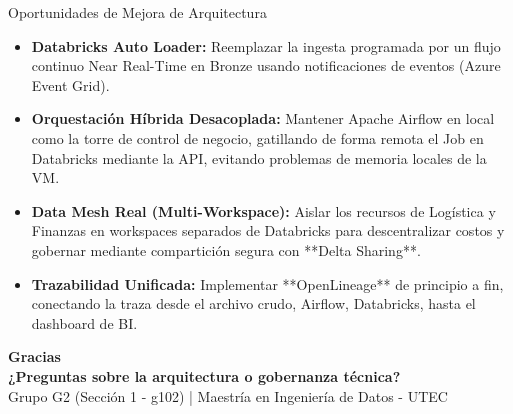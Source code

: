 \documentclass[aspectratio=169,10pt]{beamer}
\begin{document}
\begin{frame}{Oportunidades de Mejora de Arquitectura}
    \begin{itemize}
        \setlength{\itemsep}{0.6em}
        \item \textbf{Databricks Auto Loader:} Reemplazar la ingesta programada por un flujo continuo Near Real-Time en Bronze usando notificaciones de eventos (Azure Event Grid).
        \item \textbf{Orquestación Híbrida Desacoplada:} Mantener Apache Airflow en local como la torre de control de negocio, gatillando de forma remota el Job en Databricks mediante la API, evitando problemas de memoria locales de la VM.
        \item \textbf{Data Mesh Real (Multi-Workspace):} Aislar los recursos de Logística y Finanzas en workspaces separados de Databricks para descentralizar costos y gobernar mediante compartición segura con **Delta Sharing**.
        \item \textbf{Trazabilidad Unificada:} Implementar **OpenLineage** de principio a fin, conectando la traza desde el archivo crudo, Airflow, Databricks, hasta el dashboard de BI.
    \end{itemize}
\end{frame}

{
\begin{frame}[plain]
    \centering
    \vspace{1.5cm}
    {\Huge \color{UtecCyan} \textbf{Gracias}} \\[0.8cm]
    {\large \color{white} \textbf{¿Preguntas sobre la arquitectura o gobernanza técnica?}} \\[1cm]
    \footnotesize
    \color{white!70}
    Grupo G2 (Sección 1 - g102) | Maestría en Ingeniería de Datos - UTEC
\end{frame}
}
\end{document}
